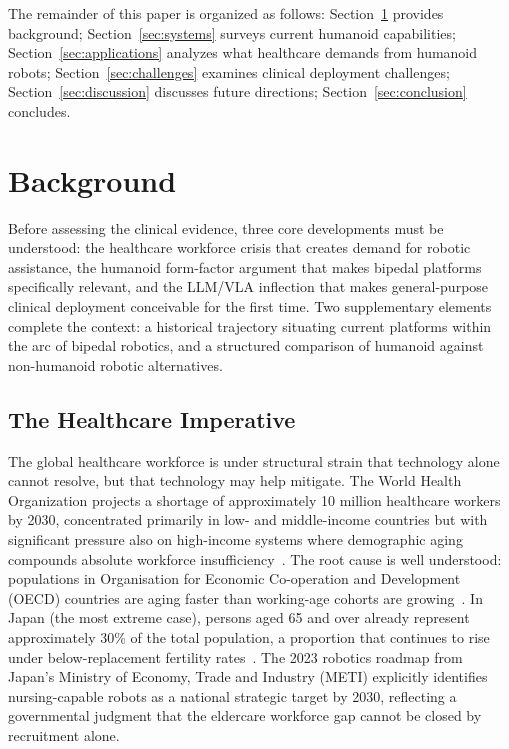 \documentclass[acmsmall]{acmart}
\begin{document}
The remainder of this paper is organized as follows:
Section~\ref{sec:background} provides background; Section~\ref{sec:systems}
surveys current humanoid capabilities; Section~\ref{sec:applications} analyzes
what healthcare demands from humanoid robots; Section~\ref{sec:challenges}
examines clinical deployment challenges; Section~\ref{sec:discussion} discusses
future directions; Section~\ref{sec:conclusion} concludes.

\section{Background}
\label{sec:background}

Before assessing the clinical evidence, three core developments must be
understood: the healthcare workforce crisis that creates demand for robotic
assistance, the humanoid form-factor argument that makes bipedal platforms
specifically relevant, and the LLM/VLA inflection that makes general-purpose
clinical deployment conceivable for the first time. Two supplementary elements
complete the context: a historical trajectory situating current platforms within
the arc of bipedal robotics, and a structured comparison of humanoid against
non-humanoid robotic alternatives.

\subsection{The Healthcare Imperative}
\label{sec:imperative}

The global healthcare workforce is under structural strain that technology alone
cannot resolve, but that technology may help mitigate. The World Health
Organization projects a shortage of approximately 10 million healthcare workers
by 2030, concentrated primarily in low- and middle-income countries but with
significant pressure also on high-income systems where demographic aging compounds
absolute workforce insufficiency~\cite{who2016workforce}. The root cause is well
understood: populations in Organisation for Economic Co-operation and Development
(OECD) countries are aging faster than working-age cohorts are
growing~\cite{oecd2023health}. In Japan (the most extreme case), persons aged 65
and over already represent approximately 30\% of the total population, a
proportion that continues to rise under below-replacement fertility
rates~\cite{japancabinet2023}. The 2023 robotics roadmap from Japan's
Ministry of Economy, Trade and Industry (METI) explicitly identifies
nursing-capable robots as a national strategic target by 2030,
reflecting a governmental judgment that the eldercare workforce gap cannot be
closed by recruitment alone.
\end{document}
